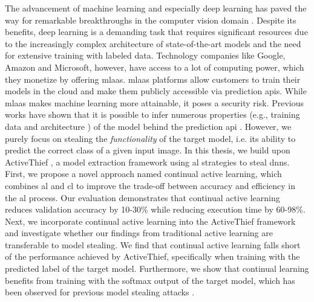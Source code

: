 \Abstract
The advancement of machine learning and especially deep learning has paved the way for remarkable breakthroughs in the computer vision domain 
\parencite*{goodfellow2020generative,he2016deep,lecun1989backpropagation}. Despite its benefits, deep learning is a demanding task that requires
significant resources due to the increasingly complex architecture of state-of-the-art models and the need for extensive training with labeled data.
Technology companies like Google, Amazon and Microsoft, however, have access to a lot of computing power, which they monetize by offering \gls{mlaas}.
\gls{mlaas} platforms allow customers to train their models in the cloud and make them publicly accessible via prediction \glspl{api}. 
While \gls{mlaas} makes machine learning more attainable, it poses a security risk. Previous works have shown that it is possible to infer numerous
properties (e.g., training data \cite{shokri2017membership} and architecture \cite{oh2019towards}) of the model behind the prediction \gls{api}
\parencite{papernot2017practical,tramer2016stealing}.
However, we purely focus on stealing the \textit{functionality} of the target model, i.e. its ability to predict the correct class of a given input image.
In this thesis, we build upon ActiveThief \cite{pal2020activethief}, a model extraction framework using \gls{al} strategies to steal \glspl{dnn}. 
First, we propose a novel approach named continual active learning, which combines \gls{al} and \gls{cl} to improve the trade-off between
accuracy and efficiency in the \gls{al} process. Our evaluation demonstrates that continual active learning reduces validation accuracy by 10-30\%
while reducing execution time by 60-98\%. Next, we incorporate continual active learning into the ActiveThief framework and investigate whether our findings
from traditional active learning are transferable to model stealing. We find that continual active learning falls short of the performance achieved by ActiveThief,
specifically when training with the predicted label of the target model. Furthermore, we show that continual learning benefits from training with the softmax
output of the target model, which has been observed for previous model stealing attacks \parencite{orekondy2019knockoff,pal2020activethief}.
